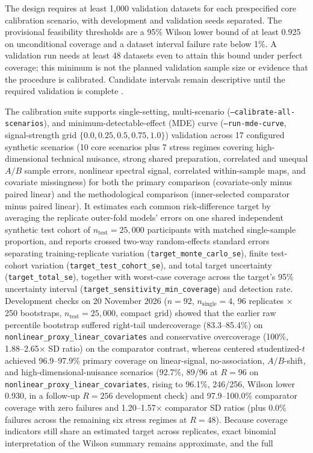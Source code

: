 \documentclass[preprint,12pt]{elsarticle}
\begin{document}
The design requires at least 1,000 validation datasets for each prespecified core calibration scenario, with development and validation seeds separated. The provisional feasibility thresholds are a 95\% Wilson lower bound of at least 0.925 on unconditional coverage and a dataset interval failure rate below 1\%. A validation run needs at least 48 datasets even to attain this bound under perfect coverage; this minimum is not the planned validation sample size or evidence that the procedure is calibrated. Candidate intervals remain descriptive until the required validation is complete \cite{bates2024, bengio2004}.

The calibration suite supports single-setting, multi-scenario (\texttt{--calibrate-\allowbreak{}all-\allowbreak{}scenarios}), and minimum-detectable-effect (MDE) curve (\texttt{--run-\allowbreak{}mde-\allowbreak{}curve}, signal-strength grid $\{0.0, 0.25, 0.5, 0.75, 1.0\}$) validation across 17 configured synthetic scenarios (10 core scenarios plus 7 stress regimes covering high-dimensional technical nuisance, strong shared preparation, correlated and unequal $A/B$ sample errors, nonlinear spectral signal, correlated within-sample maps, and covariate missingness) for both the primary comparison (covariate-only minus paired linear) and the methodological comparison (inner-selected comparator minus paired linear). It estimates each common risk-difference target by averaging the replicate outer-fold models' errors on one shared independent synthetic test cohort of $n_{\text{test}} = 25{,}000$ participants with matched single-sample proportion, and reports crossed two-way random-effects standard errors separating training-replicate variation (\texttt{target\_\allowbreak{}monte\_\allowbreak{}carlo\_\allowbreak{}se}), finite test-cohort variation (\texttt{target\_\allowbreak{}test\_\allowbreak{}cohort\_\allowbreak{}se}), and total target uncertainty (\texttt{target\_\allowbreak{}total\_\allowbreak{}se}), together with worst-case coverage across the target's 95\% uncertainty interval (\texttt{target\_\allowbreak{}sensitivity\_\allowbreak{}min\_\allowbreak{}coverage}) and detection rate. Development checks on 20 November 2026 ($n = 92$, $n_{\text{single}} = 4$, 96 replicates $\times$ 250 bootstraps, $n_{\text{test}} = 25{,}000$, compact grid) showed that the earlier raw percentile bootstrap suffered right-tail undercoverage (83.3--85.4\%) on \texttt{nonlinear\_\allowbreak{}proxy\_\allowbreak{}linear\_\allowbreak{}covariates} and conservative overcoverage (100\%, 1.88--2.65$\times$ SD ratio) on the comparator contrast, whereas centered studentized-$t$ achieved 96.9--97.9\% primary coverage on linear-signal, no-association, $A/B$-shift, and high-dimensional-nuisance scenarios (92.7\%, 89/96 at $R = 96$ on \texttt{nonlinear\_\allowbreak{}proxy\_\allowbreak{}linear\_\allowbreak{}covariates}, rising to 96.1\%, 246/256, Wilson lower 0.930, in a follow-up $R = 256$ development check) and 97.9--100.0\% comparator coverage with zero failures and 1.20--1.57$\times$ comparator SD ratios (plus 0.0\% failures across the remaining six stress regimes at $R = 48$). Because coverage indicators still share an estimated target across replicates, exact binomial interpretation of the Wilson summary remains approximate, and the full 
\end{document}
